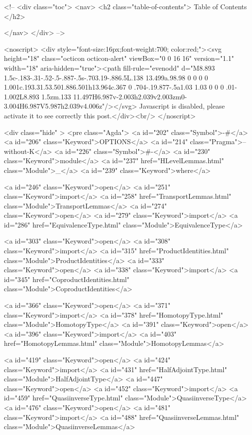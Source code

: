   <!-- 
  <div class="toc">
    <nav>
    <h2 class="table-of-contents"> Table of Contents </h2>
      

    </nav>
  </div>
   -->

  <noscript>
  <div style="font-size:16px;font-weight:700; color:red;"><svg height="18" class="octicon octicon-alert" viewBox="0 0 16 16" version="1.1" width="18" aria-hidden="true"><path fill-rule="evenodd" d="M8.893 1.5c-.183-.31-.52-.5-.887-.5s-.703.19-.886.5L.138 13.499a.98.98 0 0 0 0 1.001c.193.31.53.501.886.501h13.964c.367 0 .704-.19.877-.5a1.03 1.03 0 0 0 .01-1.002L8.893 1.5zm.133 11.497H6.987v-2.003h2.039v2.003zm0-3.004H6.987V5.987h2.039v4.006z"/></svg> Javascript is disabled, please activate it to see correctly this post.</div><br/>
  </noscript>

  <div class="hide" >
<pre class="Agda">
<a id="202" class="Symbol">{-#</a> <a id="206" class="Keyword">OPTIONS</a> <a id="214" class="Pragma">--without-K</a> <a id="226" class="Symbol">#-}</a>
<a id="230" class="Keyword">module</a> <a id="237" href="HLevelLemmas.html" class="Module">_</a> <a id="239" class="Keyword">where</a>

<a id="246" class="Keyword">open</a> <a id="251" class="Keyword">import</a> <a id="258" href="TransportLemmas.html" class="Module">TransportLemmas</a>
<a id="274" class="Keyword">open</a> <a id="279" class="Keyword">import</a> <a id="286" href="EquivalenceType.html" class="Module">EquivalenceType</a>

<a id="303" class="Keyword">open</a> <a id="308" class="Keyword">import</a> <a id="315" href="ProductIdentities.html" class="Module">ProductIdentities</a>
<a id="333" class="Keyword">open</a> <a id="338" class="Keyword">import</a> <a id="345" href="CoproductIdentities.html" class="Module">CoproductIdentities</a>

<a id="366" class="Keyword">open</a> <a id="371" class="Keyword">import</a> <a id="378" href="HomotopyType.html" class="Module">HomotopyType</a>
<a id="391" class="Keyword">open</a> <a id="396" class="Keyword">import</a> <a id="403" href="HomotopyLemmas.html" class="Module">HomotopyLemmas</a>

<a id="419" class="Keyword">open</a> <a id="424" class="Keyword">import</a> <a id="431" href="HalfAdjointType.html" class="Module">HalfAdjointType</a>
<a id="447" class="Keyword">open</a> <a id="452" class="Keyword">import</a> <a id="459" href="QuasiinverseType.html" class="Module">QuasiinverseType</a>
<a id="476" class="Keyword">open</a> <a id="481" class="Keyword">import</a> <a id="488" href="QuasiinverseLemmas.html" class="Module">QuasiinverseLemmas</a>

